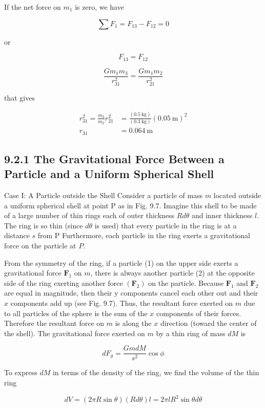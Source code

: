 \documentclass[10pt]{article}
\begin{document}
If the net force on $m_{1}$ is zero, we have

$$
\sum F_{1}=F_{13}-F_{12}=0
$$

or

$$
F_{13}=F_{12}
$$

$$
\frac{G m_{1} m_{3}}{r_{31}^{2}}=\frac{G m_{1} m_{2}}{r_{21}^{2}}
$$

that gives

$$
\begin{aligned}
r_{31}^{2}=\frac{m_{3}}{m_{2}} r_{21}^{2} & =\frac{(0.5 \mathrm{~kg})}{(0.3 \mathrm{~kg})}(0.05 \mathrm{~m})^{2} \\
r_{31} & =0.064 \mathrm{~m}
\end{aligned}
$$

\subsection*{9.2.1 The Gravitational Force Between a Particle and a Uniform Spherical Shell}
Case I: A Particle outside the Shell Consider a particle of mass $m$ located outside a uniform spherical shell at point P as in Fig. 9.7. Imagine this shell to be made of a large number of thin rings each of outer thickness $R d \theta$ and inner thickness $l$. The ring is so thin (since $d \theta$ is used) that every particle in the ring is at a distance $s$ from P Furthermore, each particle in the ring exerts a gravitational force on the particle at $P$.

From the symmetry of the ring, if a particle (1) on the upper side exerts a gravitational force $\mathbf{F}_{1}$ on $m$, there is always another particle (2) at the opposite side of the ring exerting another force $\left(\mathbf{F}_{2}\right)$ on the particle. Because $\mathbf{F}_{1}$ and $\mathbf{F}_{2}$ are equal in magnitude, then their y components cancel each other out and their $x$ components add up (see Fig. 9.7). Thus, the resultant force exerted on $m$ due to all particles of the sphere is the sum of the $x$ components of their forces. Therefore the resultant force on $m$ is along the $x$ direction (toward the center of the shell). The gravitational force exerted on $m$ by a thin ring of mass $d M$ is

$$
d F_{g}=\frac{G m d M}{s^{2}} \cos \phi
$$

To express $d M$ in terms of the density of the ring, we find the volume of the thin ring

$$
d V=(2 \pi R \sin \theta)(R d \theta) l=2 \pi l R^{2} \sin \theta d \theta
$$
\end{document}
